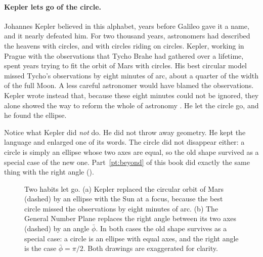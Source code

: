 \paragraph{Kepler lets go of the circle.}
Johannes Kepler believed in this alphabet, years before Galileo gave it a name, and it nearly defeated him. For two thousand years, astronomers had described the heavens with circles, and with circles riding on circles. Kepler, working in Prague with the observations that Tycho Brahe had gathered over a lifetime, spent years trying to fit the orbit of Mars with circles. His best circular model missed Tycho's observations by eight minutes of arc, about a quarter of the width of the full Moon. A less careful astronomer would have blamed the observations. Kepler wrote instead that, because these eight minutes could not be ignored, they alone showed the way to reform the whole of astronomy \citep{Kepler1609}. He let the circle go, and he found the ellipse.

Notice what Kepler did \emph{not} do. He did not throw away geometry. He kept the language and enlarged one of its words. The circle did not disappear either: a circle is simply an ellipse whose two axes are equal, so the old shape survived as a special case of the new one. Part~\ref{pt:beyond} of this book did exactly the same thing with the right angle ().

\begin{figure}[tb]
\myfloatalign
{}
\caption[Two habits let go]{Two habits let go. (a) Kepler replaced the circular orbit of Mars (dashed) by an ellipse with the Sun at a focus, because the best circle missed the observations by eight minutes of arc. (b) The General Number Plane replaces the right angle between its two axes (dashed) by an angle $\bar{\phi}$. In both cases the old shape survives as a special case: a circle is an ellipse with equal axes, and the right angle is the case $\bar{\phi} = \pi/2$. Both drawings are exaggerated for clarity.}
\label{fig:two-habits}
\end{figure}

